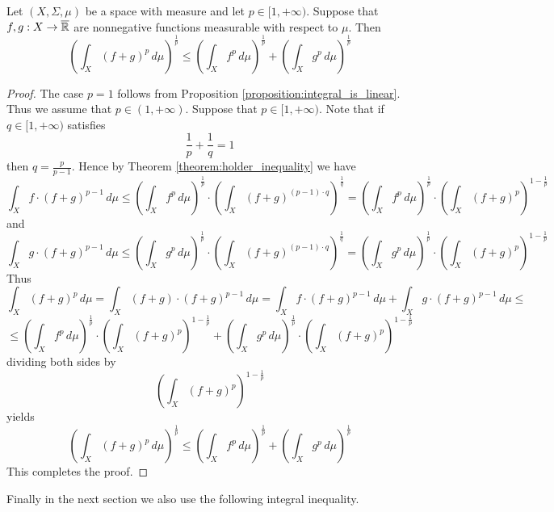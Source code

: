 \begin{corollary}[Minkowski]\label{corollary:Minkowski_inequality}
Let $(X,\Sigma,\mu)$ be a space with measure and let $p \in [1,+\infty)$. Suppose that $f,g:X\rightarrow \overline{{\mathbb R}}$ are nonnegative functions measurable with respect to $\mu$. Then
$$\left(\int_X\left(f + g\right)^p\,d\mu\right)^{\frac{1}{p}} \leq \left(\int_X f^p\,d\mu\right)^{\frac{1}{p}} + \left(\int_X g^p\,d\mu\right)^{\frac{1}{p}}$$
\end{corollary}
\begin{proof}
The case $p = 1$ follows from Proposition \ref{proposition:integral_is_linear}. Thus we assume that $p \in (1,+\infty)$. Suppose that $p \in [1,+\infty)$. Note that if $q \in [1,+\infty)$ satisfies 
$$\frac{1}{p} + \frac{1}{q} = 1$$
then $q = \frac{p}{p-1}$. Hence by Theorem \ref{theorem:holder_inequality} we have
$$\int_Xf \cdot \left(f + g\right)^{p-1}\,d\mu \leq \left(\int_X f^p\,d\mu\right)^{\frac{1}{p}}\cdot \left(\int_X\left(f + g\right)^{(p-1)\cdot q}\right)^{\frac{1}{q}} = \left(\int_X f^p\,d\mu\right)^{\frac{1}{p}}\cdot \left(\int_X\left(f + g\right)^{p}\right)^{1 - \frac{1}{p}}$$
and
$$\int_Xg \cdot \left(f + g\right)^{p-1}\,d\mu \leq \left(\int_X g^p\,d\mu\right)^{\frac{1}{p}}\cdot \left(\int_X\left(f + g\right)^{(p-1)\cdot q}\right)^{\frac{1}{q}} = \left(\int_X g^p\,d\mu\right)^{\frac{1}{p}}\cdot \left(\int_X\left(f + g\right)^{p}\right)^{1 - \frac{1}{p}}$$
Thus
$$\int_X\left(f+g\right)^p\,d\mu = \int_X\left(f + g\right)\cdot \left(f + g\right)^{p-1}\,d\mu = \int_Xf \cdot \left(f + g\right)^{p-1}\,d\mu + \int_Xg\cdot \left(f + g\right)^{p-1}\,d\mu \leq $$
$$\leq \left(\int_X f^p\,d\mu\right)^{\frac{1}{p}}\cdot \left(\int_X\left(f + g\right)^{p}\right)^{1 - \frac{1}{p}} + \left(\int_X g^p\,d\mu\right)^{\frac{1}{p}}\cdot \left(\int_X\left(f + g\right)^{p}\right)^{1 - \frac{1}{p}}$$
dividing both sides by 
$$\left(\int_X\left(f + g\right)^{p}\right)^{1 - \frac{1}{p}}$$
yields
$$\left(\int_X\left(f + g\right)^p\,d\mu\right)^{\frac{1}{p}} \leq \left(\int_X f^p\,d\mu\right)^{\frac{1}{p}} + \left(\int_X g^p\,d\mu\right)^{\frac{1}{p}}$$
This completes the proof.
\end{proof}
\noindent
Finally in the next section we also use the following integral inequality.

